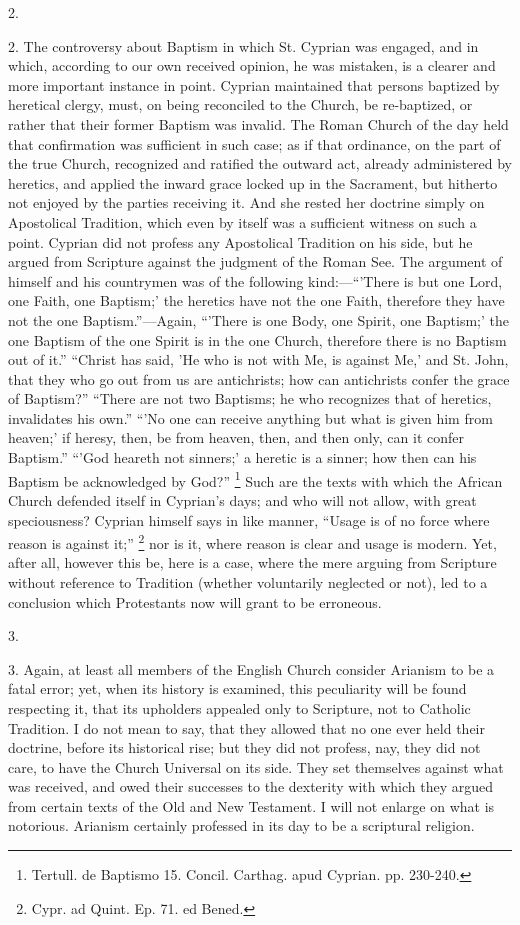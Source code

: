 2.

2. The controversy about Baptism in which St. Cyprian was engaged,
and in which, according to our own received opinion, he was mistaken,
is a clearer and more important instance in point. Cyprian maintained
that persons baptized by heretical clergy, must, on being reconciled
to the Church, be re-baptized, or rather that their former Baptism was
invalid. The Roman Church of the day held that confirmation was
sufficient in such case; as if that ordinance, on the part of the true
Church, recognized and ratified the outward act, already administered
by heretics, and applied the inward grace locked up in the Sacrament,
but hitherto not enjoyed by the parties receiving it. And she
rested her doctrine simply on Apostolical Tradition, which even by
itself was a sufficient witness on such a point. Cyprian did not
profess any Apostolical Tradition on his side, but he argued from
Scripture against the judgment of the Roman See. The argument of
himself and his countrymen was of the following kind:—``'There
is but one Lord, one Faith, one Baptism;' the heretics have not the
one Faith, therefore they have not the one Baptism.''—Again,
``'There is one Body, one Spirit, one Baptism;' the one Baptism of
the one Spirit is in the one Church, therefore there is no Baptism out
of it.'' ``Christ has said, 'He who is not with Me, is against
Me,' and St. John, that they who go out from us are antichrists; how
can antichrists confer the grace of Baptism?'' ``There are not
two Baptisms; he who recognizes that of heretics, invalidates his
own.'' ``'No one can receive anything but what is given him
from heaven;' if heresy, then, be from heaven, then, and then only,
can it confer Baptism.'' ``'God heareth not sinners;' a
heretic is a sinner; how then can his Baptism be acknowledged by
God?'' \footnote{Tertull. de Baptismo 15. Concil. Carthag.
apud Cyprian. pp. 230-240.} Such are the
texts with which the African Church defended itself in Cyprian's days;
and who will not allow, with great speciousness? Cyprian himself says
in like manner, ``Usage is of no force where reason is against
it;'' \footnote{Cypr. ad Quint. Ep. 71. ed Bened.} nor is it,
where reason is clear and usage is modern. Yet, after all, however
this be, here is a case, where the mere arguing from Scripture without
reference to Tradition (whether voluntarily neglected or not), led to
a conclusion which Protestants now will grant to be erroneous.

3.

3. Again, at least all members of the English Church consider
Arianism to be a fatal error; yet, when its history is examined, this
peculiarity will be found respecting it, that its upholders appealed
only to Scripture, not to Catholic Tradition. I do not mean to say,
that they allowed that no one ever held their doctrine, before its
historical rise; but they did not profess, nay, they did not care, to
have the Church Universal on its side. They set themselves against
what was received, and owed their successes to the dexterity with
which they argued from certain texts of the Old and New Testament. I
will not enlarge on what is notorious. Arianism certainly professed in
its day to be a scriptural religion.

